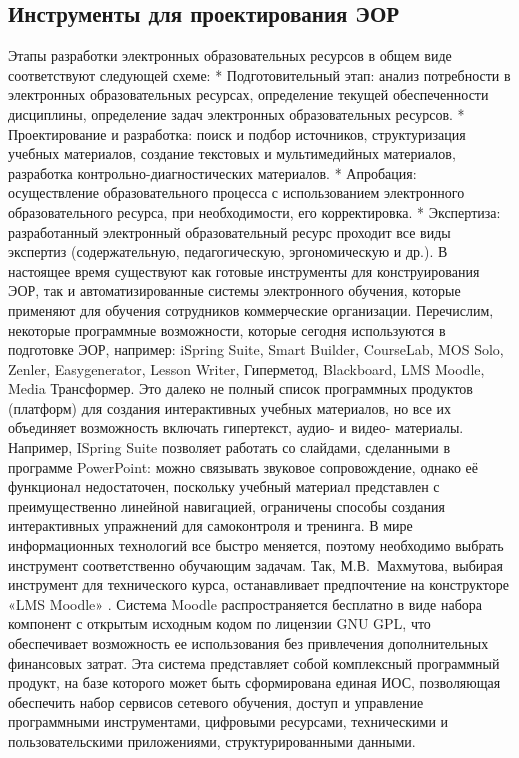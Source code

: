 \large
\subsection{Инструменты для проектирования ЭОР}
Этапы разработки электронных образовательных ресурсов в общем виде соответствуют следующей схеме:
* Подготовительный этап: анализ потребности в электронных образовательных ресурсах, определение текущей обеспеченности дисциплины, определение задач электронных образовательных ресурсов.
* Проектирование и разработка: поиск и подбор источников, структуризация учебных материалов, создание текстовых и мультимедийных материалов, разработка контрольно-диагностических материалов.
* Апробация: осуществление образовательного процесса с использованием электронного образовательного ресурса, при необходимости, его корректировка.
* Экспертиза: разработанный электронный образовательный ресурс проходит все виды экспертиз (содержательную, педагогическую, эргономическую и др.).
В настоящее время существуют как готовые инструменты для конструирования ЭОР, так и автоматизированные системы электронного обучения, которые применяют для обучения сотрудников коммерческие организации.
Перечислим, некоторые программные возможности, которые сегодня используются в подготовке ЭОР, например: iSpring Suite, Smart Builder, CourseLab, MOS Solo, Zenler, Easygenerator, Lesson Writer, Гиперметод, Blackboard, LMS Moodle, Media Трансформер.
Это далеко не полный список программных продуктов (платформ) для создания интерактивных учебных материалов, но все их объединяет возможность включать гипертекст, аудио- и видео- материалы.
Например, ISpring Suite позволяет работать со слайдами, сделанными в программе PowerPoint: можно связывать звуковое сопровождение, однако её функционал недостаточен, поскольку учебный материал представлен с преимущественно линейной навигацией, ограничены способы создания интерактивных упражнений для самоконтроля и тренинга.
В мире информационных технологий все быстро меняется, поэтому необходимо выбрать инструмент соответственно обучающим задачам.
Так, М.В.~Махмутова, выбирая инструмент для технического курса, останавливает предпочтение на конструкторе «LMS Moodle» \cite{8}. 
Система Moodle распространяется бесплатно в виде набора компонент с открытым исходным кодом по лицензии GNU GPL, что обеспечивает возможность ее использования без привлечения дополнительных финансовых затрат. Эта система представляет собой комплексный программный продукт, на базе которого может быть сформирована единая ИОС, позволяющая обеспечить набор сервисов сетевого обучения, доступ и управление программными инструментами, цифровыми ресурсами, техническими и пользовательскими приложениями, структурированными данными.
